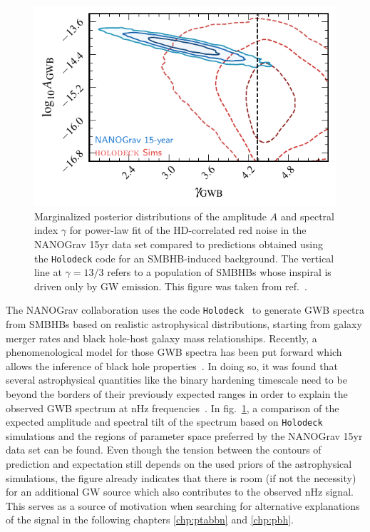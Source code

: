 \begin{figure}
	\centering
	\includegraphics[width=0.8\linewidth]{thesisplots/ng15/nano15_astrogw_compare}
	\caption{Marginalized posterior distributions of the amplitude $A$ and spectral index $\gamma$ for power-law fit of the \ac{HD}-correlated red noise in the \ac{NANOGrav} 15yr data set compared to predictions obtained using the \texttt{Holodeck} code for an \ac{SMBHB}-induced background. The vertical line at $\gamma = 13/3$ refers to a population of \acp{SMBHB} whose inspiral is driven only by \ac{GW} emission. This figure was taken from ref.~\cite{NANOGrav:2023hvm}.}
	\label{fig:nano15astrogwcompare}
\end{figure}


The \ac{NANOGrav} collaboration uses the code \texttt{Holodeck}~\cite{NANOGrav:2023gor} to generate \ac{GWB} spectra from \acp{SMBHB} based on realistic astrophysical distributions, starting from galaxy merger rates and black hole-host galaxy mass relationships. Recently, a phenomenological model for those \ac{GWB} spectra has been put forward which allows the inference of black hole properties~\cite{NANOGrav:2023hfp}. In doing so, it  was found that several astrophysical quantities like the binary hardening timescale need to be beyond the borders of their previously expected ranges in order to explain the observed \ac{GWB} spectrum at nHz frequencies~\cite{NANOGrav:2023hfp}. In fig.~\ref{fig:nano15astrogwcompare}, a comparison of the expected amplitude and spectral tilt of the spectrum based on \texttt{Holodeck} simulations and the regions of parameter space preferred by the \ac{NANOGrav} 15yr data set can be found. Even though the tension between the contours of prediction and expectation still depends on the used priors of the astrophysical simulations, the figure already indicates that there is room (if not the necessity) for an additional \ac{GW} source which also contributes to the observed nHz signal. This serves as a source of motivation when searching for alternative explanations of the signal in the following chapters \ref{chp:ptabbn} and \ref{chp:pbh}.

